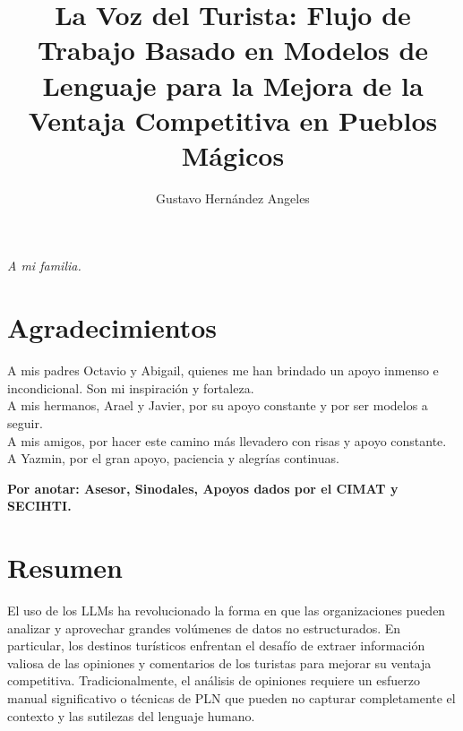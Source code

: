 \documentclass[letterpaper,12pt,twoside]{book}  %
\author{Gustavo Hernández Angeles}
\title{La Voz del Turista: Flujo de Trabajo Basado en Modelos de Lenguaje para la Mejora de la Ventaja Competitiva en Pueblos Mágicos}
\begin{document}
\maketitle  %

\thispagestyle{empty}  %

\frontmatter

\chapter*{}
\begin{flushright}%
  \emph{A mi familia.} \\[2cm]
  

  \thispagestyle{empty}
\end{flushright}

\chapter*{Agradecimientos}

\noindent A mis padres Octavio y Abigail, quienes me han brindado un apoyo inmenso e incondicional. Son mi inspiración y fortaleza. \\[0.2cm]

\noindent A mis hermanos, Arael y Javier, por su apoyo constante y por ser modelos a seguir. \\[0.2cm]

\noindent A mis amigos, por hacer este camino más llevadero con risas y apoyo constante. \\[0.2cm]

\noindent A Yazmin, por el gran apoyo, paciencia y alegrías continuas.

\noindent \textbf{Por anotar: Asesor, Sinodales, Apoyos dados por el CIMAT y SECIHTI.}
\chapter*{Resumen}

El uso de los LLMs ha revolucionado la forma en que las organizaciones pueden analizar y aprovechar grandes volúmenes de datos no estructurados. En particular, los destinos turísticos enfrentan el desafío de extraer información valiosa de las opiniones y comentarios de los turistas para mejorar su ventaja competitiva. Tradicionalmente, el análisis de opiniones requiere un esfuerzo manual significativo o técnicas de PLN que pueden no capturar completamente el contexto y las sutilezas del lenguaje humano.
\end{document}
